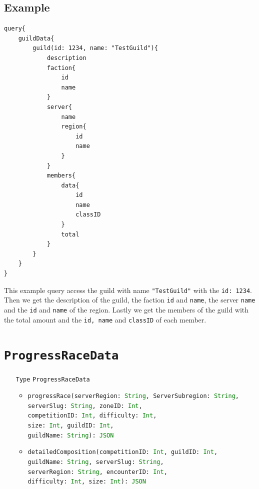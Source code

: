 \documentclass[10pt, a4paper]{memoir}
\numberwithin{equation}{section}
\theoremstyle{plain}
\theoremstyle{defp}
\theoremstyle{dotless}
\theoremstyle{definition}
\theoremstyle{dotless}
\theoremstyle{dotless}
\theoremstyle{defp}
\theoremstyle{defp}
\theoremstyle{be}          %
\theoremstyle{defp}
\newcommand\ttt[1]{\texttt{#1}}
\newcommand\type[1]{\ttt{\textcolor{green}{#1}}}
\begin{document}
\newpage

\subsection{Example}

\begin{lstlisting}[language=WowAPI]
query{
	guildData{
		guild(id: 1234, name: "TestGuild"){
			description
			faction{
				id
				name
			}
			server{
				name
				region{
					id
					name
				}
			}
			members{
				data{
					id
					name
					classID
				}
				total
			}
		}
	}
}
\end{lstlisting}

This example query access the guild with name \ttt{"TestGuild"} with the \ttt{id: 1234}. Then we get the description of the guild, the faction \ttt{id} and \ttt{name}, the server \ttt{name} and the \ttt{id} and \ttt{name} of the region. Lastly we get the members of the guild with the total amount and the \ttt{id, name} and \ttt{classID} of each member.

\newpage




\section{\ttt{ProgressRaceData}}\label{sec:ProgressRaceData}

\begin{itemize}[noitemsep,topsep=1pt]
	\item[\ttt{Type}] \ttt{ProgressRaceData}
	\begin{itemize}[itemsep=1pt,topsep=1pt]
		\item \ttt{progressRace(serverRegion: \type{String}, ServerSubregion: \type{String}, \\serverSlug: \type{String}, zoneID: \type{Int}, \\competitionID: \type{Int}, difficulty: \type{Int}, \\size: \type{Int}, guildID: \type{Int}, \\guildName: \type{String}): \type{JSON}}
		\item \ttt{detailedComposition(competitionID: \type{Int}, guildID: \type{Int}, \\guildName: \type{String}, serverSlug: \type{String}, \\serverRegion: \type{String}, encounterID: \type{Int}, \\difficulty: \type{Int}, size: \type{Int}): \type{JSON}}
	\end{itemize}
\end{itemize}
\end{document}
